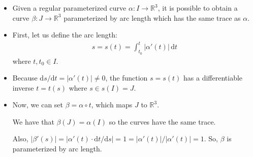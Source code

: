 \documentclass[10pt]{article}
\newcommand{\dee}{\mathrm{d}}
\newcommand{\ra}{\rightarrow}
\begin{document}
  \begin{itemize}
    \item Given a regular parameterized curve $\alpha : I \ra \mathbb{R}^3$, it is possible to obtain a curve $\beta : J \ra \mathbb{R}^3$ parameterized by arc length which has the same trace as $\alpha$.

    \item First, let us define the arc length:
    \begin{align*}
      s = s(t) = \int_{t_0}^t | \alpha'(t) |\,\dee t
    \end{align*}
    where $t, t_0 \in I$.

    \item Because $\dee s/\dee t = |\alpha'(t)| \neq 0$, the function $s = s(t)$ has a differentiable inverse $t = t(s)$ where $s \in s(I) = J$.

    \item Now, we can set $\beta = \alpha \circ t$, which maps $J$ to $\mathbb{R}^3$.

    We have that $\beta(J) = \alpha(I)$ so the curves have the same trace.

    Also, $|\beta'(s)| = | \alpha'(t) \cdot \dee t / \dee s| = 1 = |\alpha'(t)| / |\alpha'(t)| = 1$. So, $\beta$ is parameterized by arc length.  
  \end{itemize}

  
\end{document}
